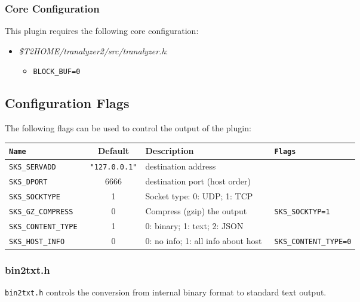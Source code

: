\documentclass[documentation]{subfiles}
\begin{document}
\subsubsection{Core Configuration}
This plugin requires the following core configuration:
\begin{itemize}
    \item {\em \$T2HOME/tranalyzer2/src/tranalyzer.h}:
        \begin{itemize}
            \item {\tt BLOCK\_BUF=0}
        \end{itemize}
\end{itemize}

\subsection{Configuration Flags}
The following flags can be used to control the output of the plugin:

\begin{longtable}{>{\tt}lcl>{\tt\small}l}
    \toprule
    {\bf Name} & {\bf Default} & {\bf Description} & {\bf Flags}\\
    \midrule\endhead%
    SKS\_SERVADD       & {\tt\small "127.0.0.1"} & destination address                & \\
    SKS\_DPORT         & 6666                    & destination port (host order)      & \\
    SKS\_SOCKTYPE      & 1                       & Socket type: 0: UDP; 1: TCP        & \\
    SKS\_GZ\_COMPRESS  & 0                       & Compress (gzip) the output         & SKS\_SOCKTYP=1\\
    SKS\_CONTENT\_TYPE & 1                       & 0: binary; 1: text; 2: JSON        & \\
    SKS\_HOST\_INFO    & 0                       & 0: no info; 1: all info about host & SKS\_CONTENT\_TYPE=0\\
    \bottomrule
\end{longtable}

\subsubsection{bin2txt.h}
{\tt bin2txt.h} controls the conversion from internal binary format to standard text output.
\end{document}
